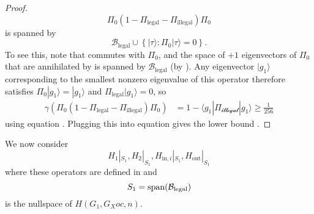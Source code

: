 \documentclass[../thesis-main/thesis-main]{subfiles}
\begin{document}
\begin{proof}
\begin{equation}
\Pi_{0}\left(1-\Pi_{\text{legal}}-\Pi_{\text{illegal}}\right)\Pi_{0}\label{eq:projector_conjugated}
\end{equation}
is spanned by 
\[
\mathcal{B}_{\text{legal}}\cup\left\{ |\tau\rangle\colon\Pi_{0}|\tau\rangle=0\right\} .
\]
To see this, note that  commutes with $\Pi_{0}$, and the space of $+1$ eigenvectors of $\Pi_{0}$ that are annihilated by  is spanned by $\mathcal{B}_{\text{legal}}$ (by ). Any eigenvector $|g_{1}\rangle$ corresponding to the smallest nonzero eigenvalue of this operator therefore satisfies $\Pi_{0}|g_{1}\rangle=|g_{1}\rangle$ and $\Pi_{\text{legal}}|g_{1}\rangle=0$, so 
\begin{align*}
\gamma(\Pi_{0}(1-\Pi_{\text{legal}}-\Pi_{\text{illegal}})\Pi_{0}) 
&= 1-\langle g_{1}|\Pi_{\mathcal{\text{illegal}}}|g_{1}\rangle\geq\frac{1}{256}
\end{align*}
using equation . Plugging this into equation  gives the lower bound . 
\end{proof}


We now consider 
\begin{equation}
H_{1}|_{S_{1}},H_{2}|_{S_{1}},H_{\text{in},i}|_{S_{1}},H_{\text{out}}|_{S_{1}}\label{eq:ops_restriction_S1}
\end{equation}
where these operators are defined in  and 
\[
S_{1}=\operatorname{span}(\mathcal{B}_{\text{legal}})
\]
is the nullspace of $H(G_1,G_Xoc,n)$.
\end{document}
